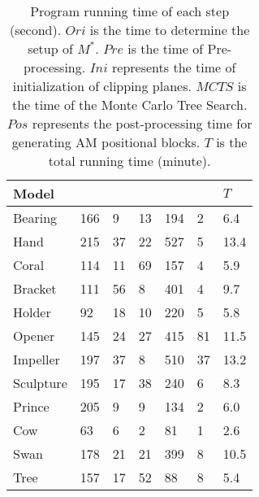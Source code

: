 
\begin{table}[t]
\renewcommand{\arraystretch}{1.0}
\centering
\caption{ 
Program running time of each step (second).
$Ori$ is the time to determine the setup of $M^*$.
$Pre$ is the time of Pre-processing.
$Ini$ represents the time of initialization of clipping planes.
$MCTS$ is the time of the Monte Carlo Tree Search.
$Pos$ represents the post-processing time for generating AM positional blocks.
$T$ is the total running time (minute).
}
\begin{tabular}{m{1.8cm}<{\centering}| m{0.65cm}<{\centering}  m{0.5cm}<{\centering} m{0.5cm}<{\centering} m{0.7cm}<{\centering} m{0.6cm}<{\centering} |m{0.8cm}<{\centering} }
\hline
{Model} 
& \centering{$Ori$} 
& \centering{$Pre$}
& \centering{$Ini$}
& \centering{$MCTS$} 
& \centering{$Pos$} 
& {$T$} \\
\hline
{Bearing}     &{166} &{9} &{13} &{194} &{2} &{6.4} \\
\hline
{Hand}     &{215} &{37} &{22} &{527} &{5} &{13.4} \\
\hline
{Coral}     &{114} &{11} &{69} &{157} &{4} &{5.9} \\
\hline
{Bracket}     &{111} &{56} &{8} &{401} &{4} &{9.7} \\
\hline
{Holder}     &{92} &{18} &{10} &{220} &{5} &{5.8} \\
\hline
{Opener}     &{145} &{24} &{27} &{415} &{81} &{11.5} \\
\hline
{Impeller}     &{197} &{37} &{8} &{510} &{37} &{13.2} \\
\hline
{Sculpture}     &{195} &{17} &{38} &{240} &{6} &{8.3} \\
\hline
{Prince}     &{205} &{9} &{9} &{134} &{2} &{6.0} \\
\hline
{Cow}     &{63} &{6} &{2} &{81} &{1} &{2.6} \\
\hline
{Swan}     &{178} &{21} &{21} &{399} &{8} &{10.5} \\
\hline
{Tree}     &{157} &{17} &{52} &{88} &{8} &{5.4} \\
\hline
\end{tabular}
\label{table:runtime}
\end{table}
